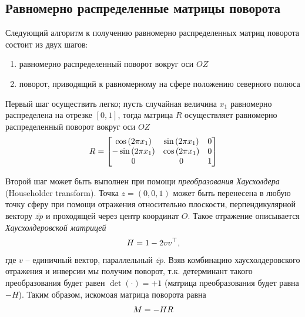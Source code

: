 \subsection{Равномерно распределенные матрицы поворота}

Следующий алгоритм к получению равномерно распределенных матриц поворота состоит из двух шагов:
\begin{enumerate}
\item равномерно распределенный поворот вокруг оси $OZ$
\item поворот, приводящий к равномерному на сфере положению северного полюса
\end{enumerate} 

Первый шаг осуществить легко; пусть случайная величина $x_1$ равномерно распределена на отрезке $[0, 1]$, тогда матрица $R$ осуществляет равномерно распределенный поворот вокруг оси $OZ$ 
\begin{gather}
R =
\begin{bmatrix}
\cos \left( 2 \pi x_1 \right) & \sin \left( 2 \pi x_1 \right) & 0 \\
- \sin \left( 2 \pi x_1 \right) & \cos \left( 2 \pi x_1 \right) & 0 \\
0 & 0 & 1
\end{bmatrix} \label{rmatrix} 
\end{gather}

Второй шаг может быть выполнен при помощи \textit{преобразования Хаусхолдера} (Householder transform). Точка $z = (0, 0, 1)$  может быть перенесена в любую точку сферу при помощи отражения относительно плоскости, перпендикулярной вектору $\bar{zp}$ и проходящей через центр координат $O$. Такое отражение описывается \textit{Хаусхолдеровской матрицей}
\begin{gather}
		H = 1 - 2 v v^\top, \notag
\end{gather}
где $v$ -- единичный вектор, параллельный $\bar{zp}$. Взяв комбинацию хаусхолдеровского отражения и инверсии мы получим поворот, т.к. детерминант такого преобразования будет равен $\det(\cdot) = + 1$ (матрица преобразования будет равна $-H$). Таким образом, искомоая матрица поворота равна
\begin{gather}
		M = - HR \notag
\end{gather}

